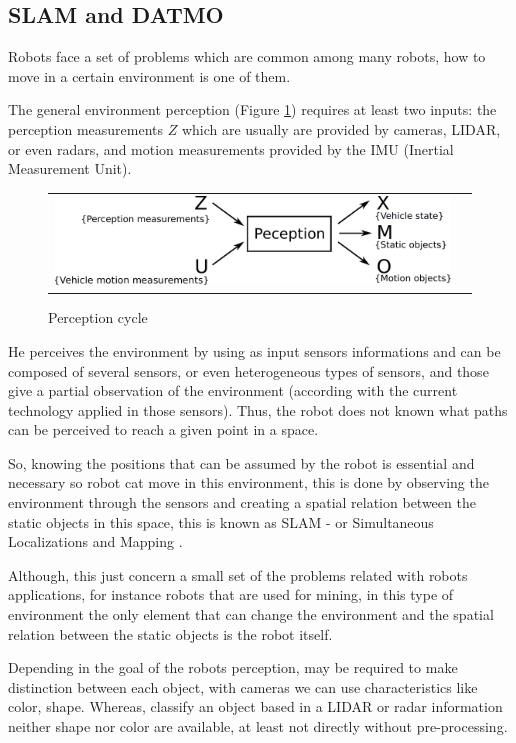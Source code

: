\subsection{SLAM and DATMO}

Robots face a set of problems which are common among many robots, how to move in a certain environment is one of them.

The general environment perception (Figure \ref{fig:perception:cycle}) requires at least two inputs: the perception measurements $Z$ which are usually are provided by cameras, LIDAR, or even radars, and motion measurements provided by the IMU (Inertial Measurement Unit).

\begin{figure}[h]
   \centering
     \begin{tabular}{lr}
       \includegraphics[scale=0.5]{img/fig:perception:cycle}
     \end{tabular}
   \caption{Perception cycle}
   \label{fig:perception:cycle}
 \end{figure}


He perceives the environment by using as input sensors informations and can be composed of several sensors, or even heterogeneous types of sensors, and those give a partial observation of the environment (according with the current technology applied in those sensors). Thus, the robot does not known what paths can be perceived to reach a given point in a space.

So, knowing the positions that can be assumed by the robot is essential and necessary so robot cat move in this environment, this is done by observing the environment through the sensors and creating a spatial relation between the static objects in this space, this is known as SLAM - or Simultaneous Localizations and Mapping \cite{iyengar1991autonomous}.

Although, this just concern a small set of the problems related with robots applications, for instance robots that are used for mining, in this type of environment the only element that can change the environment and the spatial relation between the static objects is the robot itself. 

Depending in the goal of the robots perception, may be required to make distinction between each object, with cameras we can use characteristics like color, shape. Whereas, classify an object based in a LIDAR or radar information neither shape nor color are available, at least not directly without pre-processing.

